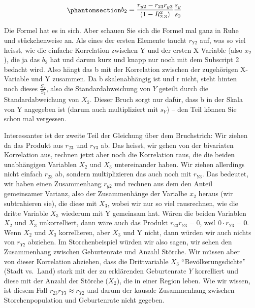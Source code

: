 \documentclass[
  10pt,
  letterpaper,
  a4paper, twoside]{scrreprt}
\begin{document}
\begin{equation}\phantomsection\label{eq-FormelFuerBs}{
\begin{aligned}
 b_2 & = \frac{r_{y2}-r_{23}r_{y3}}{(1-R_{2.3}^2)}\frac{s_y}{s_2}
\end{aligned}
}\end{equation}

Die Formel hat es in sich. Aber schauen Sie sich die Formel mal ganz in
Ruhe und stückchenweise an. Als eines der ersten Elemente taucht
\(r_{Y2}\) auf, was so viel heisst, wie die einfache Korrelation
zwischen Y und der ersten X-Variable (also \(x_2\)), die ja das \(b_2\)
hat und darum kurz und knapp nur noch mit dem Subscript 2 bedacht wird.
Also hängt das b mit der Korrelation zwischen der zugehörigen X-Variable
und Y zusammen. Da b skalenabhängig ist und r nicht, steht hinten noch
dieses \(\frac{S_Y}{S_2}\), also die Standardabweichung von \(Y\)
geteilt durch die Standardabweichung von \(X_2\). Dieser Bruch sorgt nur
dafür, dass b in der Skala von Y angegeben ist (darum auch multipliziert
mit \(s_Y\)) -- den Teil können Sie schon mal vergessen.

Interessanter ist der zweite Teil der Gleichung über dem Bruchstrich:
Wir ziehen da das Produkt aus \(r_{23}\) und \(r_{Y3}\) ab. Das heisst,
wir gehen von der bivariaten Korrelation aus, rechnen jetzt aber noch
die Korrelation raus, die die beiden unabhängigen Variablen \(X_2\) und
\(X_3\) untereinander haben. Wir ziehen allerdings nicht einfach
\(r_{23}\) ab, sondern multiplizieren das auch noch mit \(r_{Y3}\). Das
bedeutet, wir haben einen Zusammenhang \(r_{y2}\) und rechnen aus dem
den Anteil gemeinsamer Varianz, also der Zusammenhänge der Varialbe
\(x_2\) heraus (wir subtrahieren sie), die diese mit \(X_3\), wobei wir
nur so viel rausrechnen, wie die dritte Variable \(X_3\) wiederum mit Y
gemeinsam hat. Wären die beiden Variablen \(X_2\) und \(X_3\)
unkorrelliert, dann wäre auch das Produkt \(r_{23}r_{Y3} = 0\), weil
\(0 \cdot r_{Y3} = 0\). Wenn \(X_2\) und \(X_3\) korrellieren, aber
\(X_3\) und Y nicht, dann würden wir auch nichts von \(r_{Y2}\)
abziehen. Im Storchenbeispiel würden wir also sagen, wir sehen den
Zusammenhang zwischen Geburtenrate und Anzahl Störche. Wir müssen aber
von dieser Korrelation abziehen, dass die Drittvariable \(X_3\)
\enquote{Bevölkerungsdichte} (Stadt vs.~Land) stark mit der zu
erklärenden Geburtenrate \(Y\) korrelliert und diese mit der Anzahl der
Störche (\(X_2\)), die in einer Region leben. Wie wir wissen, ist diesem
Fall \(r_{23}r_{Y3} \approx r_{Y2}\) und darum der kausale Zusammenhang
zwischen Storchenpopulation und Geburtenrate nicht gegeben.
\end{document}
